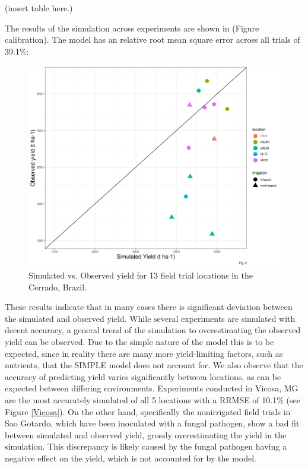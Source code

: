 \documentclass[11pt]{article}
\begin{document}
(insert table here.)

The results of the simulation across experiments are shown in (Figure calibration). The model has an relative root mean square error across all trials of 39.1\%:

\begin{figure}[htbp]
\centering
\includegraphics[width=.9\linewidth]{../results/experimental-data/2023-02-18_Obs_Sim_all_415.png}
\caption{Simulated vs. Observed yield for 13 field trial locations in the Cerrado, Brazil.}
\end{figure}

These results indicate that in many cases there is significant deviation between the simulated and observed yield. While several experiments are simulated with decent accuracy, a general trend of the simulation to overestimating the observed yield can be observed. Due to the simple nature of the model this is to be expected, since in reality there are many more yield-limiting factors, such as nutrients, that the SIMPLE model does not account for.
We also observe that the accuracy of predicting yield varies significantly between locations, as can be expected between differing environments. Experiments conducted in Vicosa, MG are the most accurately simulated of all 5 locations with a RRMSE of 10.1\% (see Figure \ref{Vicosa}). On the other hand, specifically the nonirrigated field trials in Sao Gotardo, which  have been inoculated with a fungal pathogen, show a bad fit between simulated and observed yield, grossly overestimating the yield in the simulation. This discrepancy is likely caused by the fungal pathogen having a negative effect on the yield, which is not accounted for by the model.
\end{document}
